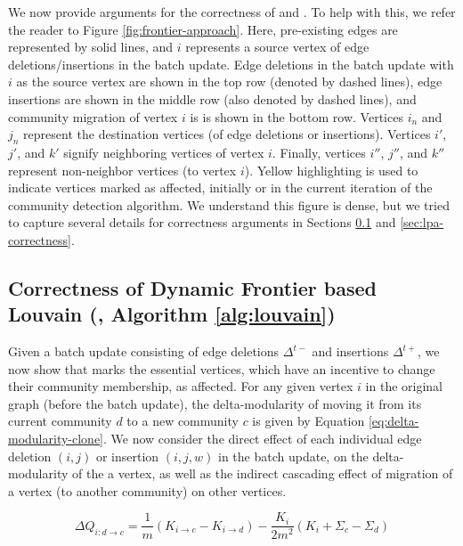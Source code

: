 We now provide arguments for the correctness of \FroLou{} and \FroLPA{}. To help with this, we refer the reader to Figure \ref{fig:frontier-approach}. Here, pre-existing edges are represented by solid lines, and $i$ represents a source vertex of edge deletions/insertions in the batch update. Edge deletions in the batch update with $i$ as the source vertex are shown in the top row (denoted by dashed lines), edge insertions are shown in the middle row (also denoted by dashed lines), and community migration of vertex $i$ is is shown in the bottom row. Vertices $i_n$ and $j_n$ represent the destination vertices (of edge deletions or insertions). Vertices $i'$, $j'$, and $k'$ signify neighboring vertices of vertex $i$. Finally, vertices $i''$, $j''$, and $k''$ represent non-neighbor vertices (to vertex $i$). Yellow highlighting is used to indicate vertices marked as affected, initially or in the current iteration of the community detection algorithm. We understand this figure is dense, but we tried to capture several details for correctness arguments in Sections \ref{sec:louvain-correctness} and \ref{sec:lpa-correctness}.




\subsection{Correctness of Dynamic Frontier based Louvain (\FroLou{}, Algorithm \ref{alg:louvain})}
\label{sec:louvain-correctness}

Given a batch update consisting of edge deletions $\Delta^{t-}$ and insertions $\Delta^{t+}$, we now show that \FroLou{} marks the essential vertices, which have an incentive to change their community membership, as affected. For any given vertex $i$ in the original graph (before the batch update), the delta-modularity of moving it from its current community $d$ to a new community $c$ is given by Equation \ref{eq:delta-modularity-clone}. We now consider the direct effect of each individual edge deletion $(i, j)$ or insertion $(i, j, w)$ in the batch update, on the delta-modularity of the a vertex, as well as the indirect cascading effect of migration of a vertex (to another community) on other vertices.

\begin{equation}
\label{eq:delta-modularity-clone}
  \Delta Q_{i: d \rightarrow c}
  = \frac{1}{m} (K_{i \rightarrow c} - K_{i \rightarrow d}) - \frac{K_i}{2m^2} (K_i + \Sigma_c - \Sigma_d)
\end{equation}

